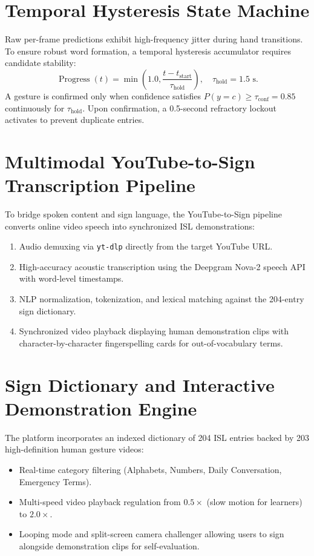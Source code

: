 \section{Temporal Hysteresis State Machine}
Raw per-frame predictions exhibit high-frequency jitter during hand transitions. To ensure robust word formation, a temporal hysteresis accumulator requires candidate stability:
\[
\operatorname{Progress}(t) = \min\left(1.0, \frac{t - t_{\text{start}}}{\tau_{\text{hold}}}\right), \quad \tau_{\text{hold}} = 1.5\text{ s}.
\]
A gesture is confirmed only when confidence satisfies $P(y=c) \ge \tau_{\text{conf}} = 0.85$ continuously for $\tau_{\text{hold}}$. Upon confirmation, a 0.5-second refractory lockout activates to prevent duplicate entries.

\section{Multimodal YouTube-to-Sign Transcription Pipeline}
To bridge spoken content and sign language, the YouTube-to-Sign pipeline converts online video speech into synchronized ISL demonstrations:
\begin{enumerate}
\item Audio demuxing via \texttt{yt-dlp} directly from the target YouTube URL.
\item High-accuracy acoustic transcription using the Deepgram Nova-2 speech API with word-level timestamps.
\item NLP normalization, tokenization, and lexical matching against the 204-entry sign dictionary.
\item Synchronized video playback displaying human demonstration clips with character-by-character fingerspelling cards for out-of-vocabulary terms.
\end{enumerate}


\section{Sign Dictionary and Interactive Demonstration Engine}
The platform incorporates an indexed dictionary of 204 ISL entries backed by 203 high-definition human gesture videos:
\begin{itemize}
\item Real-time category filtering (Alphabets, Numbers, Daily Conversation, Emergency Terms).
\item Multi-speed video playback regulation from $0.5\times$ (slow motion for learners) to $2.0\times$.
\item Looping mode and split-screen camera challenger allowing users to sign alongside demonstration clips for self-evaluation.
\end{itemize}